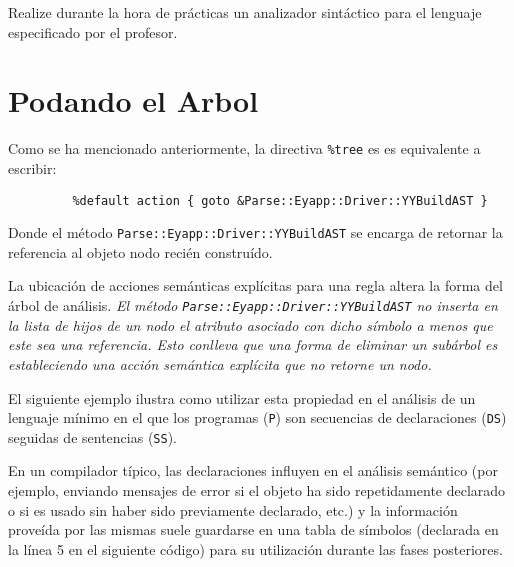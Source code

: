 \label{practica:analisissintacticoconeyapp}

Realize durante la hora de prácticas un analizador sintáctico
para el lenguaje especificado por el profesor.

\section{Podando el Arbol}
\label{section:podandoelarbol}


Como se ha mencionado anteriormente, 
la directiva \verb|%tree| es 
es equivalente a escribir:

\begin{verbatim}
         %default action { goto &Parse::Eyapp::Driver::YYBuildAST }
\end{verbatim}

Donde el método \verb|Parse::Eyapp::Driver::YYBuildAST| se encarga de
retornar la referencia al objeto nodo recién construído.

La ubicación de acciones semánticas explícitas para una regla 
altera la forma del árbol de análisis. 
\emph{El método {\tt Parse::Eyapp::Driver::YYBuildAST} no inserta 
en la lista de hijos de un nodo el atributo asociado
con dicho símbolo a menos que este sea una referencia.
Esto conlleva que una forma de eliminar un subárbol
es estableciendo una acción semántica explícita que
no retorne un nodo.}


El siguiente ejemplo ilustra como utilizar esta propiedad
en el análisis de un lenguaje mínimo en el que los programas
(\verb|P|) son secuencias de 
declaraciones (\verb|DS|) seguidas de sentencias (\verb|SS|). 

En un compilador típico,
las declaraciones influyen en el análisis semántico 
(por ejemplo, enviando mensajes de error si el objeto ha sido repetidamente 
declarado o si es usado sin haber sido previamente declarado, etc.)
y la información proveída por las mismas 
suele guardarse en una tabla de símbolos (declarada en la línea 5 
en el siguiente código) para su utilización
durante las fases posteriores.

